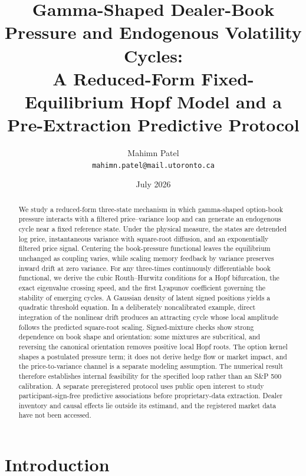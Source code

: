 \documentclass[11pt]{article}
\title{Gamma-Shaped Dealer-Book Pressure and Endogenous Volatility Cycles:\\
A Reduced-Form Fixed-Equilibrium Hopf Model and a Pre-Extraction Predictive Protocol}
\author{Mahimn Patel\\
\texttt{mahimn.patel@mail.utoronto.ca}\orcid{0009-0002-2422-9005}}
\date{July 2026}
\begin{document}
\maketitle

\begin{abstract}
We study a reduced-form three-state mechanism in which gamma-shaped option-book pressure
interacts with a filtered price--variance loop and can generate an endogenous cycle near a
fixed reference state.  Under the physical measure, the states are detrended log price,
instantaneous variance with square-root diffusion, and an exponentially filtered price
signal.  Centering the book-pressure functional leaves the equilibrium unchanged as coupling varies, while scaling
memory feedback by variance preserves inward drift at zero variance.  For any three-times
continuously differentiable book functional, we derive the cubic Routh--Hurwitz conditions for a Hopf
bifurcation, the exact eigenvalue crossing speed, and the first Lyapunov coefficient governing
the stability of emerging cycles.  A Gaussian density of latent signed positions yields a
quadratic threshold equation.  In a deliberately noncalibrated example, direct integration
of the nonlinear drift produces an attracting cycle whose local amplitude follows the
predicted square-root scaling.  Signed-mixture checks show strong dependence on book shape
and orientation: some mixtures are subcritical, and reversing the canonical orientation
removes positive local Hopf roots.  The option kernel shapes a postulated pressure term; it
does not derive hedge flow or market impact, and the price-to-variance channel is a separate
modeling assumption.  The numerical result therefore establishes internal feasibility for
the specified loop rather than an S\&P 500 calibration.  A separate preregistered protocol
uses public open interest to study participant-sign-free predictive associations before
proprietary-data extraction.  Dealer inventory and causal effects lie outside its estimand,
and the registered market data have not been accessed.
\end{abstract}

\section{Introduction}
\label{sec:introduction}
\end{document}
